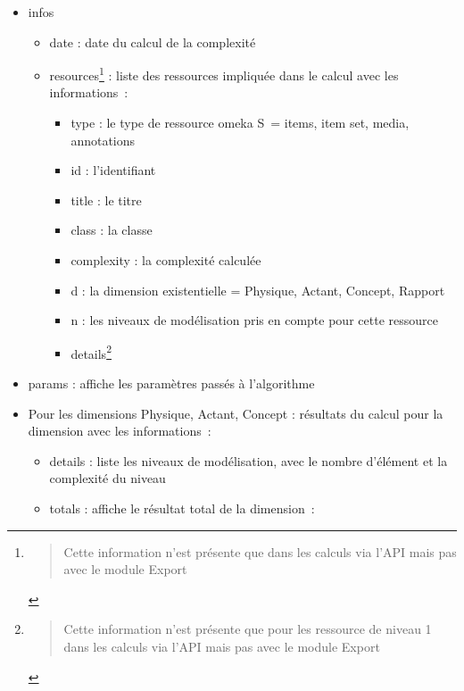 \documentclass[
  a4paper,
  DIV=11,
  numbers=noendperiod]{scrreprt}
\providecommand{\tightlist}{%
  \setlength{\itemsep}{0pt}\setlength{\parskip}{0pt}}\usepackage{longtable,booktabs,array}
\begin{document}
\begin{itemize}
\item
  infos

  \begin{itemize}
  \item
    date : date du calcul de la complexité
  \item
    resources\footnote{\begin{quote}
      Cette information n'est présente que dans les calculs via l'API
      mais pas avec le module Export
      \end{quote}} : liste des ressources impliquée dans le calcul avec
    les informations~:

    \begin{itemize}
    \tightlist
    \item
      type : le type de ressource omeka S~= items, item set, media,
      annotations
    \item
      id : l'identifiant
    \item
      title : le titre
    \item
      class : la classe
    \item
      complexity : la complexité calculée
    \item
      d : la dimension existentielle = Physique, Actant, Concept,
      Rapport
    \item
      n : les niveaux de modélisation pris en compte pour cette
      ressource
    \item
      details\footnote{\begin{quote}
        Cette information n'est présente que pour les ressource de
        niveau 1 dans les calculs via l'API mais pas avec le module
        Export
        \end{quote}}
    \end{itemize}
  \end{itemize}
\item
  params : affiche les paramètres passés à l'algorithme
\item
  Pour les dimensions Physique, Actant, Concept : résultats du calcul
  pour la dimension avec les informations~:

  \begin{itemize}
  \item
    details : liste les niveaux de modélisation, avec le nombre
    d'élément et la complexité du niveau
  \item
    totals : affiche le résultat total de la dimension~:


\end{itemize}
\end{itemize}
\end{document}
